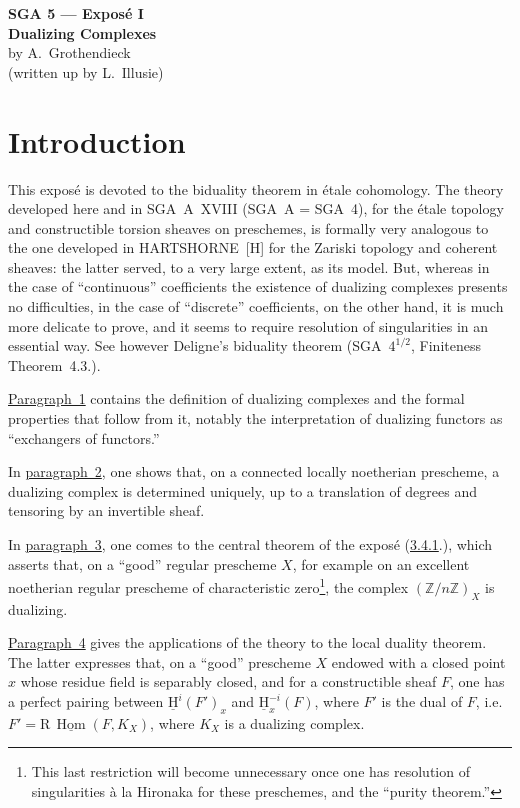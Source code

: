 \documentclass[11pt]{article}
\renewcommand{\H}{\mathrm{H}}
\DeclareMathOperator{\Hom}{Hom}
\newcommand{\R}{\mathrm{R}}
\newcommand{\Z}{\mathbb{Z}}
\providecommand{\Hom}{\operatorname{Hom}}
\providecommand{\R}{\mathrm R}
\providecommand{\Z}{\mathbb Z}
\providecommand{\Hom}{\operatorname{Hom}}
\begin{document}
\begin{center}
\label{sga5:I:expose:i}{\Large \textbf{SGA 5 --- Exposé I}}\\[0.4em]
{\large \textbf{Dualizing Complexes}}\\[0.3em]
by A.~Grothendieck\\
(written up by L.~Illusie)
\end{center}

\section*{Introduction}

This exposé is devoted to the biduality theorem in étale cohomology. The theory developed here and in SGA~A~XVIII (SGA~A = SGA~4), for the étale topology and constructible torsion sheaves on preschemes, is formally very analogous to the one developed in HARTSHORNE~[H] for the Zariski topology and coherent sheaves: the latter served, to a very large extent, as its model. But, whereas in the case of ``continuous'' coefficients the existence of dualizing complexes presents no difficulties, in the case of ``discrete'' coefficients, on the other hand, it is much more delicate to prove, and it seems to require resolution of singularities in an essential way. See however Deligne's biduality theorem (SGA~$4^{1/2}$, Finiteness Theorem~4.3.).

\hyperref[sga5:I:subsection:1]{Paragraph~1} contains the definition of dualizing complexes and the formal properties that follow from it, notably the interpretation of dualizing functors as ``exchangers of functors.''

In \hyperref[sga5:I:section:2]{paragraph~2}, one shows that, on a connected locally noetherian prescheme, a dualizing complex is determined uniquely, up to a translation of degrees and tensoring by an invertible sheaf.

In \hyperref[sga5:I:section:3]{paragraph~3}, one comes to the central theorem of the exposé (\hyperref[sga5:I:theorem:3.4.1]{3.4.1}.), which asserts that, on a ``good'' regular prescheme $X$, for example on an excellent noetherian regular prescheme of characteristic zero\footnote{This last restriction will become unnecessary once one has resolution of singularities à la Hironaka for these preschemes, and the ``purity theorem.''}, the complex $(\Z/n\Z)_X$ is dualizing.

\hyperref[sga5:I:section:4]{Paragraph~4} gives the applications of the theory to the local duality theorem. The latter expresses that, on a ``good'' prescheme $X$ endowed with a closed point $x$ whose residue field is separably closed, and for a constructible sheaf $F$, one has a perfect pairing between $\underline{\H}^i(F')_x$ and $\underline{\H}^{-i}_x(F)$, where $F'$ is the dual of $F$, i.e.\ $F' = \R\,\underline{\Hom}(F,K_X)$, where $K_X$ is a dualizing complex.
\end{document}
